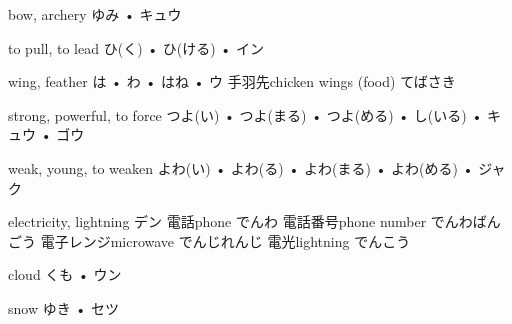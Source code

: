 



\setcounter{cardnum}{17}

		{bow, archery}
		{ゆみ • キュウ}
		{}{}
		{}{}
		{}{}
		{}{}
		{}{}

		{to pull, to lead}
		{ひ(く) • ひ(ける) • イン}
		{}{}
		{}{}
		{}{}
		{}{}
		{}{}

		{wing, feather}
		{は • わ • はね • ウ}
		{手羽先}{chicken wings (food) てばさき}
		{}{}
		{}{}
		{}{}
		{}{}

		{strong, powerful, to force}
		{つよ(い) • つよ(まる) • つよ(める) • し(いる) • キュウ • ゴウ}
		{}{}
		{}{}
		{}{}
		{}{}
		{}{}

		{weak, young, to weaken}
		{よわ(い) • よわ(る) • よわ(まる) • よわ(める) • ジャク}
		{}{}
		{}{}
		{}{}
		{}{}
		{}{}

		{electricity, lightning}
		{デン}
		{電話}{phone でんわ}
		{電話番号}{phone number でんわばんごう}
		{電子レンジ}{microwave でんじれんじ}
		{電光}{lightning でんこう}
		{}{}

		{cloud}
		{くも • ウン}
		{}{}
		{}{}
		{}{}
		{}{}
		{}{}

		{snow}
		{ゆき • セツ}
		{}{}
		{}{}
		{}{}
		{}{}
		{}{}

